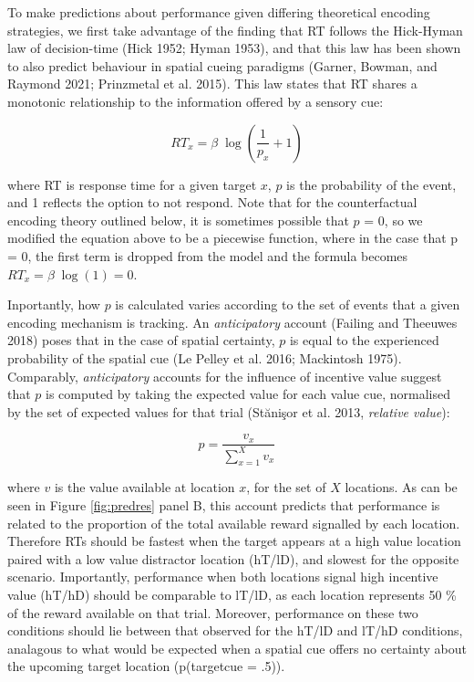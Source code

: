 \documentclass[11pt,halfline,a4paper,]{ouparticle}
\begin{document}
To make predictions about performance given differing theoretical encoding strategies, we first take advantage of the finding that RT follows the Hick-Hyman law of decision-time (Hick 1952; Hyman 1953), and that this law has been shown to also predict behaviour in spatial cueing paradigms (Garner, Bowman, and Raymond 2021; Prinzmetal et al. 2015). This law states that RT shares a monotonic relationship to the information offered by a sensory cue:

\begin{equation}\label{eq:HH}
  RT_x = \beta \; \log(\frac{1}{p_x} + 1)
\end{equation}

where RT is response time for a given target \(x\), \(p\) is the probability of the event, and 1 reflects the option to not respond. Note that for the counterfactual encoding theory outlined below, it is sometimes possible that \(p\) = 0, so we modified the equation above to be a piecewise function, where in the case that p = 0, the first term is dropped from the model and the formula becomes \(RT_x = \beta \; \log(1) = 0\).

Inportantly, how \(p\) is calculated varies according to the set of events that a given encoding mechanism is tracking. An \emph{anticipatory} account (Failing and Theeuwes 2018) poses that in the case of spatial certainty, \(p\) is equal to the experienced probability of the spatial cue (Le Pelley et al. 2016; Mackintosh 1975). Comparably, \emph{anticipatory} accounts for the influence of incentive value suggest that \(p\) is computed by taking the expected value for each value cue, normalised by the set of expected values for that trial (Stănişor et al. 2013, \emph{relative value}):

\begin{equation}\label{eq:relVal}
  p = \frac{v_x}{\sum_{x=1}^{X} v_x}
\end{equation}

where \(v\) is the value available at location \(x\), for the set of \(X\) locations. As can be seen in Figure \ref{fig:predres} panel B, this account predicts that performance is related to the proportion of the total available reward signalled by each location. Therefore RTs should be fastest when the target appears at a high value location paired with a low value distractor location (hT/lD), and slowest for the opposite scenario. Importantly, performance when both locations signal high incentive value (hT/hD) should be comparable to lT/lD, as each location represents 50 \% of the reward available on that trial. Moreover, performance on these two conditions should lie between that observed for the hT/lD and lT/hD conditions, analagous to what would be expected when a spatial cue offers no certainty about the upcoming target location (p(target\textbar cue = .5)).
\end{document}
